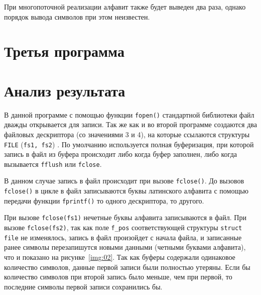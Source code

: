 При многопоточной реализации алфавит также будет выведен два раза, однако
порядок вывода символов при этом неизвестен.

\clearpage
\section{Третья программа}

\vspace{-0.5cm}




\vspace{-0.7cm}
\section*{Анализ результата}
\vspace{-0.2cm}

В данной программе с помощью функции \texttt{fopen()} стандартной
библиотеки файл дважды открывается для записи. Так же как и во второй программе
создаются два файловых дескриптора (со значениями 3 и 4), на которые
ссылаются структуры \texttt{FILE} (\texttt{fs1, fs2}) . По умолчанию используется полная
буферизация, при которой запись в файл из буфера происходит либо когда буфер
заполнен, либо когда вызывается \texttt{fflush} или
\texttt{fclose}.

В данном случае запись в файл происходит при вызове \texttt{fclose()}. До
вызовов \texttt{fclose()} в цикле в файл записываются буквы латинского
алфавита с помощью передачи функции \texttt{fprintf()} то одного
дескриптора, то другого.

При вызове \texttt{fclose(fs1)} нечетные буквы алфавита записываются в файл.
При вызове \texttt{fclose(fs2)}, так как поле \texttt{f\_pos}
соответствующей структуры \texttt{struct file} не изменялось, запись в файл
произойдет с начала файла, и записанные ранее символы перезапишутся новыми
данными (четными буквами алфавита), что и показано на рисунке~\ref{img:02}.
Так как буферы содержали одинаковое количество символов, данные первой
записи были полностью утеряны. Если бы количество символов при второй
запись было меньше, чем при первой, то последние символы первой записи
сохранились бы.

